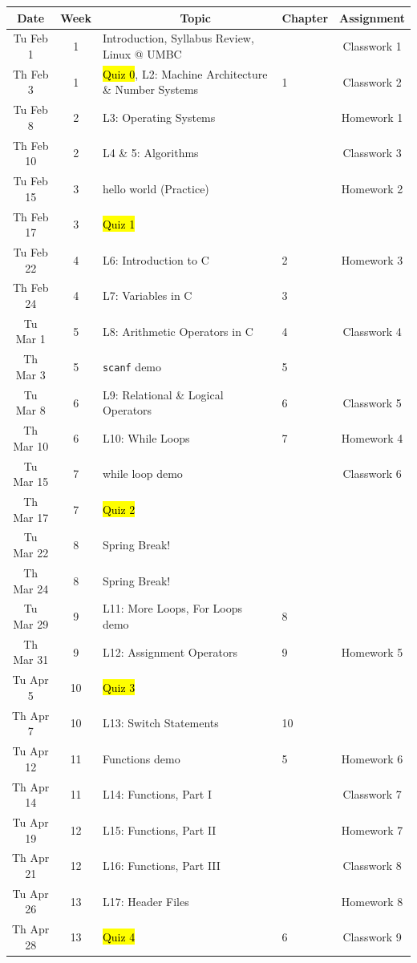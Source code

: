 \documentclass[letter,11pt]{article}
\begin{document}
\small
\begin{tabular}{c c l l c}
Date & Week & ~~~~~~~~~~~~Topic & Chapter & Assignment \\
\hline
Tu Feb 1  & 1 & Introduction, Syllabus Review, Linux @ UMBC & & Classwork 1  \\
Th Feb 3  & 1 & \hl{Quiz 0}, L2: Machine Architecture \& Number Systems & 1 & Classwork 2 \\
Tu Feb 8  & 2 & L3: Operating Systems & & Homework 1 \\
Th Feb 10 & 2 & L4 \& 5: Algorithms & & Classwork 3 \\
Tu Feb 15 & 3 & hello world (Practice) & & Homework 2 \\
Th Feb 17 & 3 & \hl{Quiz 1} & &  \\
Tu Feb 22 & 4 & L6: Introduction to C & 2 & Homework 3\\
Th Feb 24 & 4 & L7: Variables in C & 3 \\ \hline

Tu Mar 1 & 5 & L8: Arithmetic Operators in C & 4 & Classwork 4 \\
Th Mar 3 & 5 & \texttt{scanf} demo & 5 &  \\
Tu Mar 8 & 6 & L9: Relational \& Logical Operators & 6 & Classwork 5 \\
Th Mar 10 & 6 & L10: While Loops & 7 & Homework 4 \\
Tu Mar 15 & 7 & while loop demo & & Classwork 6 \\
Th Mar 17 & 7 & \hl{Quiz 2} & & \\
Tu Mar 22 & 8 & {\color{cadmiumgreen}Spring Break!} & & \\
Th Mar 24 & 8 & {\color{cadmiumgreen}Spring Break!} & &  \\
Tu Mar 29 & 9 & L11: More Loops, For Loops demo & 8 &  \\
Th Mar 31 & 9 & L12: Assignment Operators & 9 & Homework 5\\ \hline

Tu Apr 5 & 10 & \hl{Quiz 3} & & \\
Th Apr 7 & 10 & L13: Switch Statements & 10 & \\
Tu Apr 12 & 11 & Functions demo & 5 & Homework 6\\
Th Apr 14 & 11 & L14: Functions, Part I & & Classwork 7  \\
Tu Apr 19 & 12 & L15: Functions, Part II & &  Homework 7 \\
Th Apr 21 & 12 & L16: Functions, Part III  & & Classwork 8 \\
Tu Apr 26 & 13 & L17: Header Files & & Homework 8\\
Th Apr 28 & 13 & \hl{Quiz 4} & 6 & Classwork 9 \\ \hline


\end{tabular}
\end{document}
